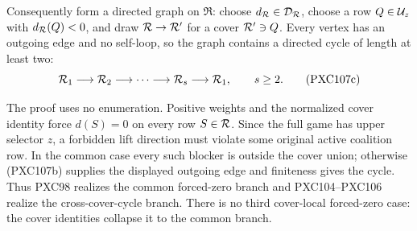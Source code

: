 \documentclass[11pt]{article}
\begin{document}
Consequently form a directed graph on \(\mathfrak R\): choose
\(d_{\cal R}\in{\cal D}_{\cal R}\), choose a row
\(Q\in{\cal U}_z\) with \(d_{\cal R}(Q)<0\), and draw
\({\cal R}\to{\cal R}'\) for a cover \({\cal R}'\ni Q\).  Every vertex has
an outgoing edge and no self-loop, so the graph contains a directed cycle of
length at least two:
\begin{equation}
 {\cal R}_1\longrightarrow{\cal R}_2\longrightarrow\cdots
 \longrightarrow{\cal R}_s\longrightarrow{\cal R}_1,
 \qquad s\ge2.                                           \tag{PXC107c}
\end{equation}

The proof uses no enumeration.  Positive weights and the normalized cover
identity force \(d(S)=0\) on every row \(S\in{\cal R}\).  Since the full
game has upper selector \(z\), a forbidden lift direction must violate some
original active coalition row.  In the common case every such blocker is
outside the cover union; otherwise (PXC107b) supplies the displayed outgoing
edge and finiteness gives the cycle.  Thus PXC98 realizes the common
forced-zero branch and PXC104--PXC106 realize the cross-cover-cycle branch.
There is no third cover-local forced-zero case: the cover identities collapse
it to the common branch.
\end{document}
